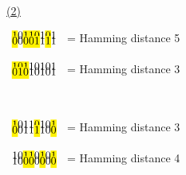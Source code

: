 \documentclass[12pt]{article}
\begin{document}
~\\\hyperlink{toc}{\hypertarget{6.2}{(2)}}\\
\begin{minipage}[t]{0.5\textwidth}
	\begin{center}
		$
			\begin{array}{l}
				\text{\hl{1}0\hl{1}\hl{1}\hl{0}1\hl{0}1} \\[-2.5mm]
				\text{\hl{0}0\hl{0}\hl{0}\hl{1}1\hl{1}1}
			\end{array}
		$ = Hamming distance 5
	\end{center}
\end{minipage}
\begin{minipage}[t]{0.5\textwidth}
	\begin{center}
		$
			\begin{array}{l}
				\text{\hl{1}\hl{0}\hl{1}10101} \\[-2.5mm]
				\text{\hl{0}\hl{1}\hl{0}10101}
			\end{array}
		$ = Hamming distance 3
	\end{center}
\end{minipage}\\

\begin{minipage}[t]{0.5\textwidth}
	\begin{center}
		$
			\begin{array}{l}
				\text{\hl{1}011\hl{0}10\hl{1}} \\[-2.5mm]
				\text{\hl{0}011\hl{1}10\hl{0}}
			\end{array}
		$ = Hamming distance 3
	\end{center}
\end{minipage}
\begin{minipage}[t]{0.5\textwidth}
	\begin{center}
		$
			\begin{array}{l}
				\text{10\hl{1}\hl{1}0\hl{1}0\hl{1}} \\[-2.5mm]
				\text{10\hl{0}\hl{0}0\hl{0}0\hl{0}}
			\end{array}
		$ = Hamming distance 4
	\end{center}
\end{minipage}\\
\end{document}
